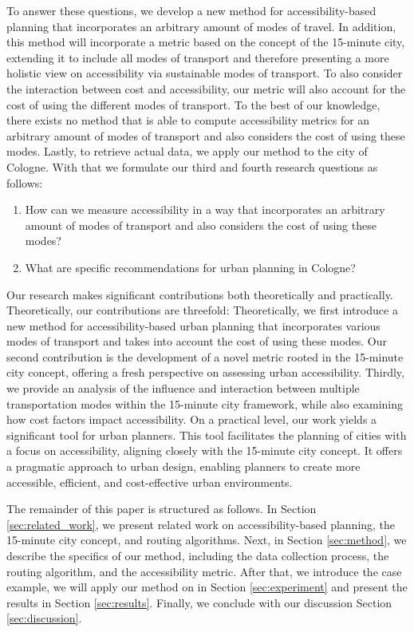 To answer these questions, we develop a new method for accessibility-based planning that incorporates an arbitrary amount of modes of travel.
In addition, this method will incorporate a metric based on the concept of the 15-minute city, extending it to include all modes of transport and therefore presenting a more holistic view on accessibility via sustainable modes of transport.
To also consider the interaction between cost and accessibility, our metric will also account for the cost of using the different modes of transport.
To the best of our knowledge, there exists no method that is able to compute accessibility metrics for an arbitrary amount of modes of transport and also considers the cost of using these modes.
Lastly, to retrieve actual data, we apply our method to the city of Cologne.
With that we formulate our third and fourth research questions as follows:

\begin{enumerate}
  \renewcommand{\labelenumi}{RQ \theenumi.}
  \setcounter{enumi}{2}
  \item How can we measure accessibility in a way that incorporates an arbitrary amount of modes of transport and also considers the cost of using these modes?
  \item What are specific recommendations for urban planning in Cologne?
\end{enumerate}

Our research makes significant contributions both theoretically and practically. Theoretically, our contributions are threefold:
Theoretically, we first introduce a new method for accessibility-based urban planning that incorporates various modes of transport and takes into account the cost of using these modes.
Our second contribution is the development of a novel metric rooted in the 15-minute city concept, offering a fresh perspective on assessing urban accessibility.
Thirdly, we provide an analysis of the influence and interaction between multiple transportation modes within the 15-minute city framework, while also examining how cost factors impact accessibility.
On a practical level, our work yields a significant tool for urban planners. 
This tool facilitates the planning of cities with a focus on accessibility, aligning closely with the 15-minute city concept. 
It offers a pragmatic approach to urban design, enabling planners to create more accessible, efficient, and cost-effective urban environments.

The remainder of this paper is structured as follows.
In Section \ref{sec:related_work}, we present related work on accessibility-based planning, the 15-minute city concept, and routing algorithms.
Next, in Section \ref{sec:method}, we describe the specifics of our method, including the data collection process, the routing algorithm, and the accessibility metric.
After that, we introduce the case example, we will apply our method on in Section \ref{sec:experiment} and present the results in Section \ref{sec:results}.
Finally, we conclude with our discussion Section \ref{sec:discussion}.

